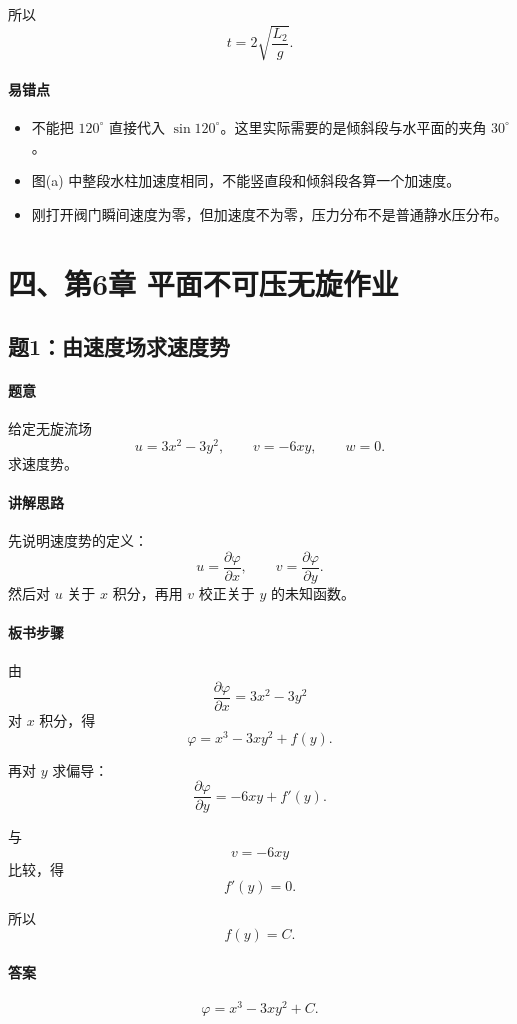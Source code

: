 ﻿\documentclass[12pt,a4paper]{ctexart}
\begin{document}
所以
\[
\boxed{
t=2\sqrt{\frac{L_2}{g}}.
}
\]

\paragraph{易错点}
\begin{itemize}
  \item 不能把 $120^\circ$ 直接代入 $\sin120^\circ$。这里实际需要的是倾斜段与水平面的夹角 $30^\circ$。
  \item 图(a) 中整段水柱加速度相同，不能竖直段和倾斜段各算一个加速度。
  \item 刚打开阀门瞬间速度为零，但加速度不为零，压力分布不是普通静水压分布。
\end{itemize}

\section*{四、第6章 平面不可压无旋作业}

\subsection*{题1：由速度场求速度势}

\paragraph{题意}
给定无旋流场
\[
u=3x^2-3y^2,\qquad v=-6xy,\qquad w=0.
\]
求速度势。

\paragraph{讲解思路}
先说明速度势的定义：
\[
u=\frac{\partial\varphi}{\partial x},\qquad
v=\frac{\partial\varphi}{\partial y}.
\]
然后对 $u$ 关于 $x$ 积分，再用 $v$ 校正关于 $y$ 的未知函数。

\paragraph{板书步骤}
由
\[
\frac{\partial\varphi}{\partial x}=3x^2-3y^2
\]
对 $x$ 积分，得
\[
\varphi=x^3-3xy^2+f(y).
\]

再对 $y$ 求偏导：
\[
\frac{\partial\varphi}{\partial y}
=-6xy+f'(y).
\]

与
\[
v=-6xy
\]
比较，得
\[
f'(y)=0.
\]

所以
\[
f(y)=C.
\]

\paragraph{答案}
\[
\boxed{
\varphi=x^3-3xy^2+C.
}
\]
\end{document}
